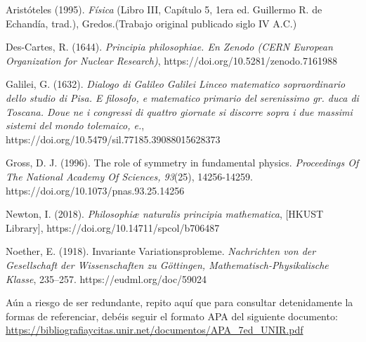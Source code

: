 \documentclass[11pt,a4paper,spanish]{book}
\begin{document}
\begin{thebibliography}{a}
	

 Aristóteles (1995). \emph{Física} (Libro III, Capítulo 5, 1era ed. Guillermo R. de Echandía, trad.), Gredos.(Trabajo original publicado siglo IV A.C.)

 Des-Cartes, R. (1644). \emph{Principia philosophiae. En Zenodo (CERN European Organization for Nuclear Research)}, https://doi.org/10.5281/zenodo.7161988

 Galilei, G. (1632). \emph{Dialogo di Galileo Galilei Linceo matematico sopraordinario dello studio di Pisa. E filosofo, e matematico primario del serenissimo gr. duca di Toscana. Doue ne i congressi di quattro giornate si discorre sopra i due massimi sistemi del mondo tolemaico, e.}, https://doi.org/10.5479/sil.77185.39088015628373

 Gross, D. J. (1996). The role of symmetry in fundamental physics. \emph{Proceedings Of The National Academy Of Sciences, 93}(25), 14256-14259. https://doi.org/10.1073/pnas.93.25.14256

  Newton, I. (2018). \emph{Philosophiæ naturalis principia mathematica}, [HKUST Library], https://doi.org/10.14711/spcol/b706487
 
 Noether, E. (1918). Invariante Variationsprobleme. \emph{Nachrichten von der Gesellschaft der Wissenschaften zu Göttingen, Mathematisch-Physikalische Klasse}, 235–257. https://eudml.org/doc/59024


 



\vspace{3cm}
Aún a riesgo de ser redundante, repito aquí que para consultar detenidamente la formas de referenciar, debéis seguir el formato APA del siguiente documento: \url{https://bibliografiaycitas.unir.net/documentos/APA_7ed_UNIR.pdf}

\end{thebibliography}
\end{document}
